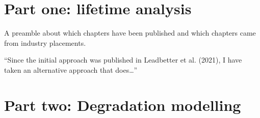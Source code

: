 \documentclass[apa,colorlinks,emptypage]{curtinThesis}
\begin{document}
\createtitlepage %

\plagiarismstatement %

\showthesisquote %











\part{Part one: lifetime analysis}\label{part:one}

A preamble about which chapters have been published and which chapters came from industry placements.

``Since the initial approach was published in Leadbetter et al. (2021), I have taken an alternative approach that does\ldots''




\part{Part two: Degradation modelling}\label{part:two}
\end{document}
